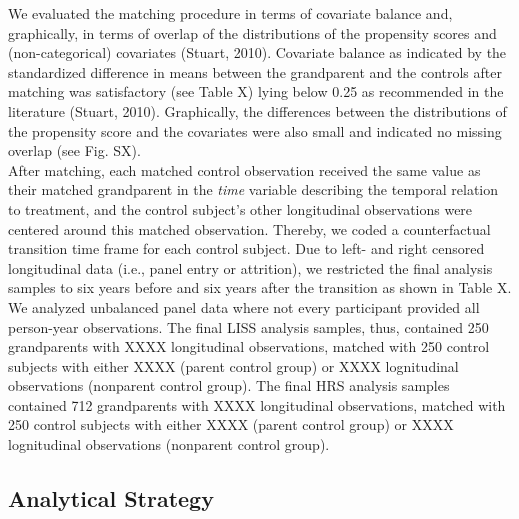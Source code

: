 \documentclass[
  english,
  man, noextraspace]{apa7}
\begin{document}
We evaluated the matching procedure in terms of covariate balance and, graphically, in terms of overlap of the distributions of the propensity scores and (non-categorical) covariates (Stuart, 2010). Covariate balance as indicated by the standardized difference in means between the grandparent and the controls after matching was satisfactory (see Table X) lying below 0.25 as recommended in the literature (Stuart, 2010). Graphically, the differences between the distributions of the propensity score and the covariates were also small and indicated no missing overlap (see Fig. SX).\\
After matching, each matched control observation received the same value as their matched grandparent in the \emph{time} variable describing the temporal relation to treatment, and the control subject's other longitudinal observations were centered around this matched observation. Thereby, we coded a counterfactual transition time frame for each control subject. Due to left- and right censored longitudinal data (i.e., panel entry or attrition), we restricted the final analysis samples to six years before and six years after the transition as shown in Table X. We analyzed unbalanced panel data where not every participant provided all person-year observations. The final LISS analysis samples, thus, contained 250 grandparents with XXXX longitudinal observations, matched with 250 control subjects with either XXXX (parent control group) or XXXX lognitudinal observations (nonparent control group). The final HRS analysis samples contained 712 grandparents with XXXX longitudinal observations, matched with 250 control subjects with either XXXX (parent control group) or XXXX lognitudinal observations (nonparent control group).

\hypertarget{analytical-strategy}{%
\subsection{Analytical Strategy}\label{analytical-strategy}}
\end{document}
